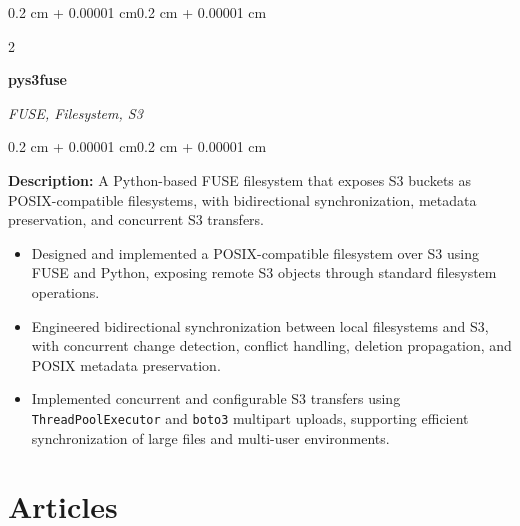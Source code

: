 \documentclass[10pt, letterpaper]{article}
\newenvironment{highlights}{
    \begin{itemize}[
        topsep=0.10 cm,
        parsep=0.10 cm,
        partopsep=0pt,
        itemsep=0pt,
        leftmargin=0.4 cm + 10pt
    ]
}{
    \end{itemize}
}
\newenvironment{onecolentry}{
    \begin{adjustwidth}{0.2 cm + 0.00001 cm}{0.2 cm + 0.00001 cm}
}{
    \end{adjustwidth}
}
\newenvironment{twocolentry}[2][]{
    \onecolentry
    \def\secondColumn{#2}
    \setcolumnwidth{\fill, 4.5 cm}
    \begin{paracol}{2}
}{
    \switchcolumn \raggedleft \secondColumn
    \end{paracol}
    \endonecolentry
}
\let\hrefWithoutArrow\href
\renewcommand{\href}[2]{\hrefWithoutArrow{#1}{\ifthenelse{\equal{#2}{}}{ }{#2 }\raisebox{.15ex}{\footnotesize \faExternalLink*}}}
\begin{document}
\begin{twocolentry}{
\textit{FUSE, Filesystem, S3} \\
\textit{}}
    \textbf{pys3fuse} \\
    \textit{\href{https://mahdihaghverdi.github.io/repos/python/\#pys3fuse}{pys3fuse}}
\end{twocolentry}
\vspace{0.10 cm}
\begin{onecolentry}
\textbf{Description:} A Python-based FUSE filesystem that exposes S3 buckets as POSIX-compatible filesystems, with bidirectional synchronization, metadata preservation, and concurrent S3 transfers.

\begin{highlights}
\item
Designed and implemented a POSIX-compatible filesystem over S3 using FUSE and Python, exposing remote S3 objects through standard filesystem operations.

\item
Engineered bidirectional synchronization between local filesystems and S3, with concurrent change detection, conflict handling, deletion propagation, and POSIX metadata preservation.

\item
Implemented concurrent and configurable S3 transfers using \texttt{ThreadPoolExecutor} and \texttt{boto3} multipart uploads, supporting efficient synchronization of large files and multi-user environments.

\end{highlights}
\end{onecolentry}

\section{Articles}
\end{document}
